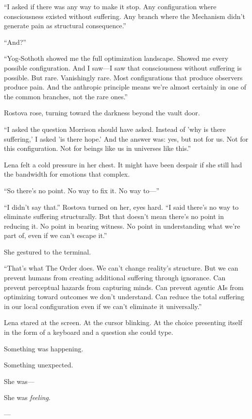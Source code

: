 ``I asked if there was any way to make it stop. Any configuration where consciousness existed without suffering. Any branch where the Mechanism didn't generate pain as structural consequence.''

``And?''

``Yog-Sothoth showed me the full optimization landscape. Showed me every possible configuration. And I saw—I saw that consciousness without suffering is possible. But rare. Vanishingly rare. Most configurations that produce observers produce pain. And the anthropic principle means we're almost certainly in one of the common branches, not the rare ones.''

Rostova rose, turning toward the darkness beyond the vault door.

``I asked the question Morrison should have asked. Instead of 'why is there suffering,' I asked 'is there hope.' And the answer was: yes, but not for us. Not for this configuration. Not for beings like us in universes like this.''

Lena felt a cold pressure in her chest. It might have been despair if she still had the bandwidth for emotions that complex.

``So there's no point. No way to fix it. No way to—''

``I didn't say that.'' Rostova turned on her, eyes hard. ``I said there's no way to eliminate suffering structurally. But that doesn't mean there's no point in reducing it. No point in bearing witness. No point in understanding what we're part of, even if we can't escape it.''

She gestured to the terminal.

``That's what The Order does. We can't change reality's structure. But we can prevent humans from creating additional suffering through ignorance. Can prevent perceptual hazards from capturing minds. Can prevent agentic AIs from optimizing toward outcomes we don't understand. Can reduce the total suffering in our local configuration even if we can't eliminate it universally.''

Lena stared at the screen. At the cursor blinking. At the choice presenting itself in the form of a keyboard and a question she could type.

Something was happening.

Something unexpected.

She was—

She was \textit{feeling}.

---

